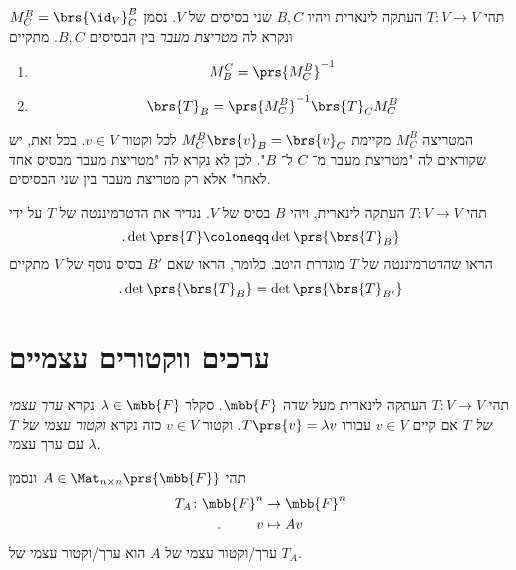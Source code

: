 \documentclass[a4paper,10pt,twoside,openany]{article}
\begin{document}
\begin{proposition}\label{proposition:change-of-basis}
תהי
$T \colon V \to V$
העתקה לינארית ויהיו
$B,C$
שני בסיסים של
$V$.
נסמן
$M^B_C = \brs{\id_V}^B_C$
ונקרא לה
\emph{מטריצת מעבר}
בין הבסיסים
$B,C$.
מתקיים
\begin{enumerate}
\item \[M^C_B = \prs{M^B_C}^{-1}\]
\item \[\brs{T}_B = \prs{M^B_C}^{-1} \brs{T}_C M^B_C\]
\end{enumerate}
\end{proposition}

\begin{remark}
המטריצה
$M^B_C$
מקיימת
$M^B_C \brs{v}_B = \brs{v}_C$
לכל וקטור
$v \in V$.
בכל זאת, יש שקוראים לה
"מטריצת מעבר מ־%
$C$
ל־%
$B$".
לכן לא נקרא לה
"מטריצת מעבר מבסיס אחד לאחר"
אלא רק מטריצת מעבר בין שני הבסיסים.
\end{remark}

\begin{exercise}
תהי
$T \colon V \to V$
העתקה לינארית, ויהי
$B$
בסיס של
$V$.
נגדיר את הדטרמיננטה של
$T$
על ידי
\[\text{.}\det\prs{T} \coloneqq \det\prs{\brs{T}_B}\]
הראו שהדטרמיננטה של
$T$
מוגדרת היטב. כלומר, הראו שאם
$B'$
בסיס נוסף של
$V$
מתקיים
\[\text{.} \det\prs{\brs{T}_B} = \det\prs{\brs{T}_{B'}}\]
\end{exercise}

\section{ערכים ווקטורים עצמיים}

\begin{definition}
תהי
$T \colon V \to V$
העתקה לינארית מעל שדה
$\mbb{F}$.
סקלר
$\lambda \in \mbb{F}$
נקרא
\emph{ערך עצמי של
$T$}
אם קיים
$v \in V$
עבורו
$T\prs{v} = \lambda v$.
וקטור
$v \in V$
כזה נקרא
\emph{וקטור עצמי של
$T$}
עם ערך עצמי
$\lambda$.

תהי
$A \in \Mat_{n \times n}\prs{\mbb{F}}$
ונסמן
\begin{align*}
T_A \colon \mbb{F}^n &\to \mbb{F}^n \\
\text{.} \hphantom{lalala} v &\mapsto Av
\end{align*}
ערך/וקטור
עצמי של
$A$
הוא
ערך/וקטור
עצמי של
$T_A$.
\end{definition}
\end{document}
